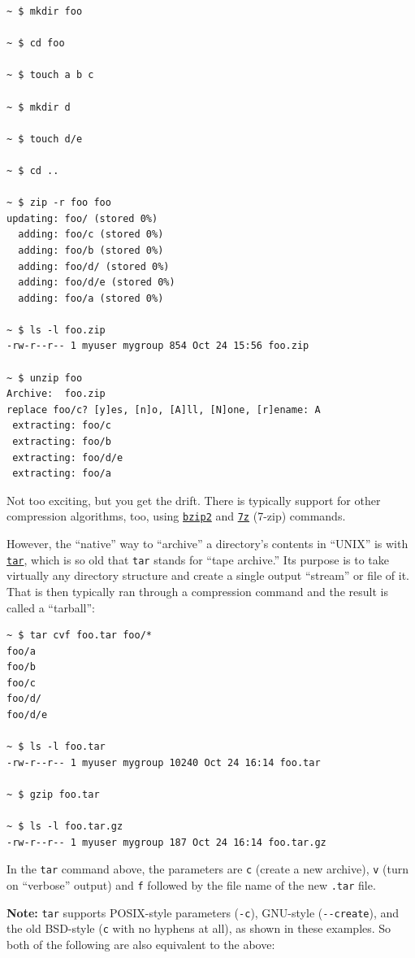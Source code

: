 \documentclass[10pt,]{book}
\numberwithin{figure}{chapter}
\begin{document}
\begin{verbatim}
~ $ mkdir foo

~ $ cd foo

~ $ touch a b c

~ $ mkdir d

~ $ touch d/e

~ $ cd ..

~ $ zip -r foo foo
updating: foo/ (stored 0%)
  adding: foo/c (stored 0%)
  adding: foo/b (stored 0%)
  adding: foo/d/ (stored 0%)
  adding: foo/d/e (stored 0%)
  adding: foo/a (stored 0%)

~ $ ls -l foo.zip
-rw-r--r-- 1 myuser mygroup 854 Oct 24 15:56 foo.zip

~ $ unzip foo
Archive:  foo.zip
replace foo/c? [y]es, [n]o, [A]ll, [N]one, [r]ename: A
 extracting: foo/c                   
 extracting: foo/b                   
 extracting: foo/d/e                 
 extracting: foo/a                   
\end{verbatim}

Not too exciting, but you get the drift. There is typically support for
other compression algorithms, too, using
\href{http://linux.die.net/man/1/bzip2}{\texttt{bzip2}} and
\href{http://linux.die.net/man/1/7z}{\texttt{7z}} (7-zip) commands.

However, the ``native'' way to ``archive'' a directory's contents in
``UNIX'' is with \href{http://linux.die.net/man/1/tar}{\texttt{tar}},
which is so old that \texttt{tar} stands for ``tape archive.'' Its
purpose is to take virtually any directory structure and create a single
output ``stream'' or file of it. That is then typically ran through a
compression command and the result is called a ``tarball'':

\begin{verbatim}
~ $ tar cvf foo.tar foo/*
foo/a
foo/b
foo/c
foo/d/
foo/d/e

~ $ ls -l foo.tar
-rw-r--r-- 1 myuser mygroup 10240 Oct 24 16:14 foo.tar

~ $ gzip foo.tar

~ $ ls -l foo.tar.gz 
-rw-r--r-- 1 myuser mygroup 187 Oct 24 16:14 foo.tar.gz
\end{verbatim}

In the \texttt{tar} command above, the parameters are \texttt{c} (create
a new archive), \texttt{v} (turn on ``verbose'' output) and \texttt{f}
followed by the file name of the new \texttt{.tar} file.

\textbf{Note:} \texttt{tar} supports POSIX-style parameters
(\texttt{-c}), GNU-style (\texttt{-{}-create}), and the old BSD-style
(\texttt{c} with no hyphens at all), as shown in these examples. So both
of the following are also equivalent to the above:
\end{document}
